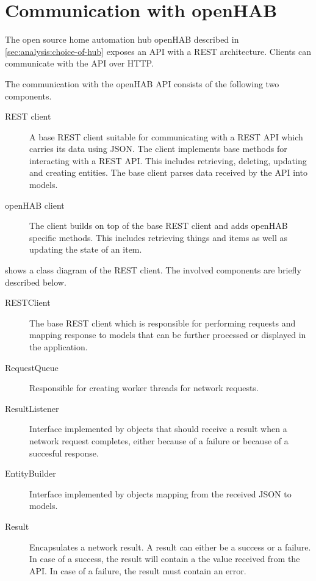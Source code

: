 \section{Communication with openHAB}
\label{sec:design:communication-with-openhab}

The open source home automation hub openHAB described in \cref{sec:analysis:choice-of-hub} exposes an API with a REST architecture. Clients can communicate with the API over HTTP.

The communication with the openHAB API consists of the following two components.

\begin{description}
\item[REST client] A base REST client suitable for communicating with a REST API which carries its data using JSON. The client implements base methods for interacting with a REST API. This includes retrieving, deleting, updating and creating entities. The base client parses data received by the API into models.
\item[openHAB client] The client builds on top of the base REST client and adds openHAB specific methods. This includes retrieving things and items as well as updating the state of an item.
\end{description}

 shows a class diagram of the REST client. The involved components are briefly described below.

\begin{description}
\item[RESTClient] The base REST client which is responsible for performing requests and mapping response to models that can be further processed or displayed in the application.
\item[RequestQueue] Responsible for creating worker threads for network requests.
\item[ResultListener] Interface implemented by objects that should receive a result when a network request completes, either because of a failure or because of a succesful response.
\item[EntityBuilder] Interface implemented by objects mapping from the received JSON to models.
\item[Result] Encapsulates a network result. A result can either be a success or a failure. In case of a success, the result will contain a the value received from the API. In case of a failure, the result must contain an error.
\end{description}


